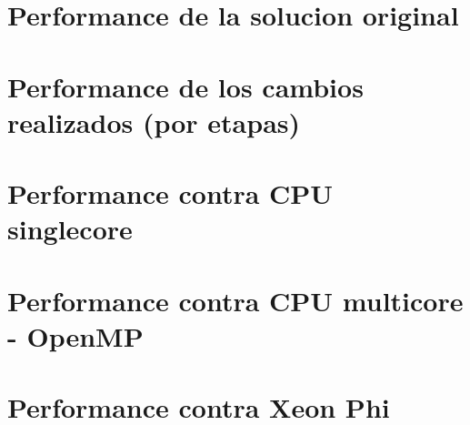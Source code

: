 \section{Performance de la solucion original}
\section{Performance de los cambios realizados (por etapas)}


\section{Performance contra CPU singlecore}
\section{Performance contra CPU multicore - OpenMP}
\section{Performance contra Xeon Phi}
